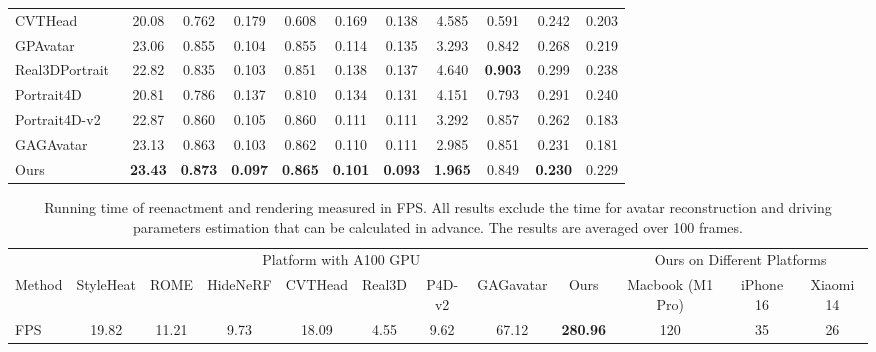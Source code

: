 \begin{table*}[h]
\begin{tabular}{l|ccccccc|ccc}
        CVTHead~\citep{ma2024cvthead}               & 20.08      & 0.762      & 0.179      & 0.608      & 0.169      & 0.138      & 4.585      & 0.591      & {0.242} & 0.203      \\
        GPAvatar~\citep{gpavatar2024}               & {23.06} & {0.855} & {0.104} & 0.855      & {0.114} & 0.135      & {3.293} & 0.842      & 0.268      & 0.219      \\
        Real3DPortrait~\citep{ye2024real3d}         & 22.82      & 0.835      & {0.103} & 0.851      & 0.138      & 0.137      & 4.640      & \textbf{0.903} & 0.299      & 0.238      \\
        Portrait4D~\citep{deng2024portrait4d}       & 20.81      & 0.786      & 0.137      & 0.810      & 0.134      & 0.131      & 4.151      & 0.793      & 0.291      & 0.240      \\
        Portrait4D-v2~\citep{deng2024portrait4d2}   & {22.87} & {0.860} & {0.105} & {0.860} & {0.111} & {0.111} & {3.292} & {0.857} & {0.262} & {0.183} \\
        GAGAvatar~\cite{GAGAvatar}                  & 23.13 & 0.863 & 0.103 & 0.862 & 0.110 & 0.111 & 2.985 & 0.851 & 0.231 & 0.181  \\
\midrule
        Ours                                        & \textbf{23.43} & \textbf{0.873} & \textbf{0.097} & \textbf{0.865} & \textbf{0.101} & \textbf{0.093} & \textbf{1.965} & 0.849 & \textbf{0.230} & 0.229  \\
\bottomrule
\end{tabular}
\label{tab:hdtf_results}
    \vspace{-.05in}
\end{table*}

\setlength{\tabcolsep}{3pt}
\begin{table*}[h]
    \centering
    \caption{Running time of reenactment and rendering measured in FPS. All results exclude the time for avatar reconstruction and driving parameters estimation that can be calculated in advance. The results are averaged over 100 frames.}
    \label{tab:fps}
    \vspace{-.1in}
    \begin{tabular}{l|cccccccc|ccc}
        \toprule
& \multicolumn{8}{c|}{Platform with A100 GPU} & \multicolumn{3}{c}{Ours on Different Platforms} \\
        Method & StyleHeat & ROME & HideNeRF & CVTHead & Real3D & P4D-v2 & GAGavatar & Ours & Macbook (M1 Pro) & iPhone 16 & Xiaomi 14 \\
        \midrule
        FPS    & 19.82 & 11.21 & 9.73 & 18.09 & 4.55 & 9.62 & 67.12 & \textbf{280.96} & 120 & 35 & 26 \\
        \bottomrule
    \end{tabular}
    \vspace{-.01in}
\end{table*}
\setlength{\tabcolsep}{5pt}


